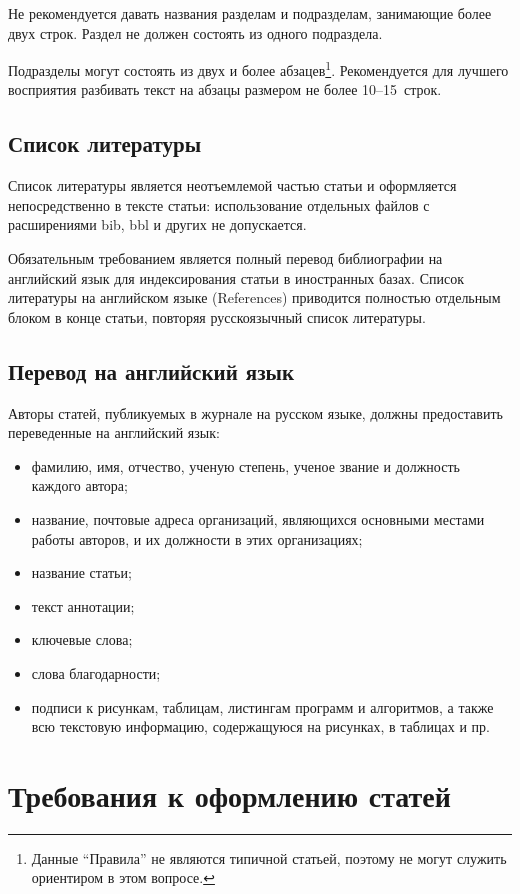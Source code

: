 \documentclass[10pt,a4paper]{book}
\begin{document}
Не рекомендуется давать названия разделам и подразделам, занимающие более 
двух строк. Раздел не должен состоять из одного подраздела. 

Подразделы могут состоять из двух и более абзацев\footnote{Данные ``Правила''
не являются типичной статьей, поэтому не могут служить ориентиром 
в этом вопросе.}. Рекомендуется для лучшего восприятия разбивать текст на 
абзацы размером не более 10--15~строк.

\subsection{Список литературы}
Список литературы является неотъемлемой частью статьи и оформляется 
непосредственно в тексте статьи: использование отдельных файлов с 
расширениями bib, bbl и других не допускается. 

Обязательным требованием является полный перевод библиографии на 
английский язык для индексирования статьи в иностранных базах.
Список литературы на английском языке (References) приводится полностью 
отдельным блоком в конце статьи, повторяя русскоязычный список литературы.


\subsection{Перевод на английский язык}
Авторы статей, публикуемых в журнале на русском языке, должны предоставить
переведенные на английский язык:
\begin{itemize}[itemsep=0pt,parsep=0pt,topsep=0pt,partopsep=0pt]
\item фамилию, имя, отчество, ученую степень, ученое звание и должность каждого автора;
\item название, почтовые адреса организаций, являющихся основными местами работы
      авторов, и их должности в этих организациях;
\item название статьи;
\item текст аннотации;
\item ключевые слова;
\item слова благодарности;
\item подписи к рисункам, таблицам, листингам программ и алгоритмов, а также всю
      текстовую информацию, содержащуюся на рисунках, в таблицах и пр.
\end{itemize}

\vspace*{2mm}

\section{Требования к оформлению статей}
\end{document}
